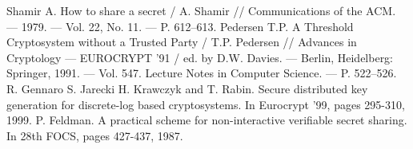 \begin{thebibliography}{99}

 Shamir A. How to share a secret / A. Shamir // Communications of the ACM. --- 1979. --- Vol. 22, No. 11. --- P. 612--613.
 Pedersen T.P. A Threshold Cryptosystem without a Trusted Party / T.P. Pedersen // Advances in Cryptology --- EUROCRYPT '91 / ed. by D.W. Davies. --- Berlin, Heidelberg: Springer, 1991. --- Vol. 547. Lecture Notes in Computer Science. --- P. 522--526.
 R. Gennaro S. Jarecki H. Krawczyk and T. Rabin. Secure distributed key generation for discrete-log based cryptosystems. In Eurocrypt '99, pages 295-310, 1999.
 P. Feldman. A practical scheme for non-interactive verifiable secret sharing. In 28th FOCS, pages 427-437, 1987. 
\end{thebibliography}
